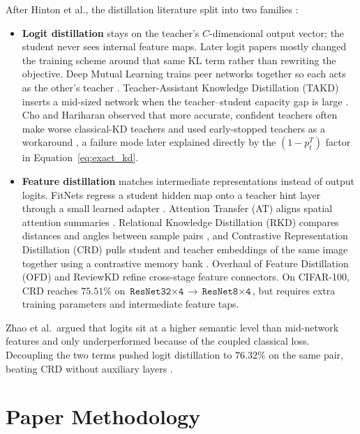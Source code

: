 \documentclass[11pt]{article}
\begin{document}
After Hinton et al., the distillation literature split into two families \cite{zhao2022}:
\begin{itemize}
    \item \textbf{Logit distillation} stays on the teacher's \(C\)-dimensional output vector; the student never sees internal feature maps. Later logit papers mostly changed the training scheme around that same KL term rather than rewriting the objective. Deep Mutual Learning trains peer networks together so each acts as the other's teacher \cite{zhang2018}. Teacher-Assistant Knowledge Distillation (TAKD) inserts a mid-sized network when the teacher--student capacity gap is large \cite{mirzadeh2020}. Cho and Hariharan observed that more accurate, confident teachers often make worse classical-KD teachers and used early-stopped teachers as a workaround \cite{cho2019}, a failure mode later explained directly by the \((1 - p_t^T)\) factor in Equation~\eqref{eq:exact_kd}.
    \item \textbf{Feature distillation} matches intermediate representations instead of output logits. FitNets regress a student hidden map onto a teacher hint layer through a small learned adapter \cite{romero2015}. Attention Transfer (AT) aligns spatial attention summaries \cite{zagoruyko2017}. Relational Knowledge Distillation (RKD) compares distances and angles between sample pairs \cite{park2019}, and Contrastive Representation Distillation (CRD) pulls student and teacher embeddings of the same image together using a contrastive memory bank \cite{tian2020}. Overhaul of Feature Distillation (OFD) \cite{heo2019} and ReviewKD \cite{chen2021} refine cross-stage feature connectors. On CIFAR-100, CRD reaches \(75.51\%\) on \(\texttt{ResNet32$\times$4} \to \texttt{ResNet8$\times$4}\), but requires extra training parameters and intermediate feature taps.
\end{itemize}

Zhao et al.\ argued that logits sit at a higher semantic level than mid-network features and only underperformed because of the coupled classical loss. Decoupling the two terms pushed logit distillation to \(76.32\%\) on the same pair, beating CRD without auxiliary layers \cite{zhao2022}.

\section{Paper Methodology}
\label{sec:method}
\end{document}
